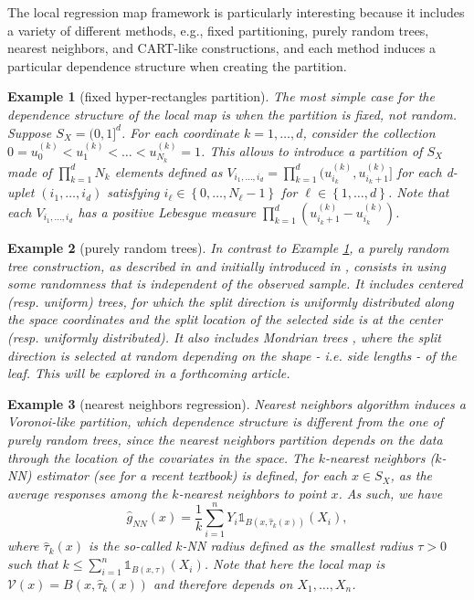 \documentclass[paper=a4, fontsize=11pt]{scrartcl}
\newcommand{\ind}{\mathds{1}}
\newtheorem{example}{Example}
\begin{document}
The local regression map framework is particularly interesting because it includes a variety of different methods, e.g., fixed partitioning,  purely random trees, nearest neighbors, and CART-like constructions, and each method induces a particular dependence structure when creating the partition. 


\begin{example}[fixed hyper-rectangles partition]\label{ex1}
    The most simple case for the dependence structure of the local map is when the partition is fixed, not random. Suppose $S_X= (0,1]^d$. For each coordinate $k =1,\ldots, d$, consider the collection $0 = u_0^{(k)} < u_1^{(k)} < \ldots < u_{N_k}^{(k)} = 1$. This allows to introduce a partition of $S_X$ made of $ \prod_{k=1} ^d N_k $ elements defined as $ V_{i_1,\ldots, i_d} =  \prod_{ k = 1 }^d (u_{i_k}^{(k)}, u_{i_k + 1 }^{(k)} ]$ for each d-uplet $(i_1,\ldots, i_d)$ satisfying $i_\ell\in \left\{0,\ldots,N_\ell-1 \right\}$ for $\ell\in \left\{1,\ldots,d \right\}$. Note that each $V_{i_1,\ldots, i_d}$ has a positive Lebesgue measure $ \prod_{ k = 1 }^d (u_{i_k + 1 }^{(k)} - u_{i_k}^{(k)} )$.
\end{example} 

\begin{example}[purely random trees]
In contrast to Example \ref{ex1}, a \textit{purely random tree} construction, as described in \cite{arlot2014analysis} and initially introduced in \cite{breiman2000some},  consists in using some randomness that is independent of the observed sample. It includes centered (resp. uniform) trees, for which the split direction is uniformly distributed along the space coordinates and the split location of the selected side is at the center (resp. uniformly distributed). It also includes Mondrian trees \citep{lakshminarayanan2014mondrian}, where the split direction is selected at random depending on the shape - i.e. side lengths - of the leaf. This will be explored in a forthcoming article. %
\end{example}

\begin{example}[nearest neighbors regression]\label{ex3}
    Nearest neighbors algorithm induces a Voronoi-like partition, which dependence structure is different from the one of purely random trees, since the nearest neighbors partition depends on the data through the location of the covariates in the space. The $k$-nearest neighbors ($k$-NN) estimator (see \cite{biau2015lectures} for a recent textbook) is defined, for each $x\in S_X$, as the average responses among the $k$-nearest neighbors to point $x$. As such, we have
$$ \hat g_{NN}(x) =  \frac{1}{k }  \sum_{i=1}^n  Y_i\ind_{B(x, \hat \tau_k(x))} (X_i ) ,$$ where $\hat \tau_k(x)$ is the so-called $k$-NN radius defined as the smallest radius $\tau>0 $ such that $k \leq\sum_{i=1}^n  \ind_{B(x,  \tau ) } (X_i )$. Note that here the local map is $\mathcal V (x)  = B(x, \hat \tau_k(x))$ and therefore  depends on $X_1,\ldots, X_n$.
\end{example}
\end{document}
